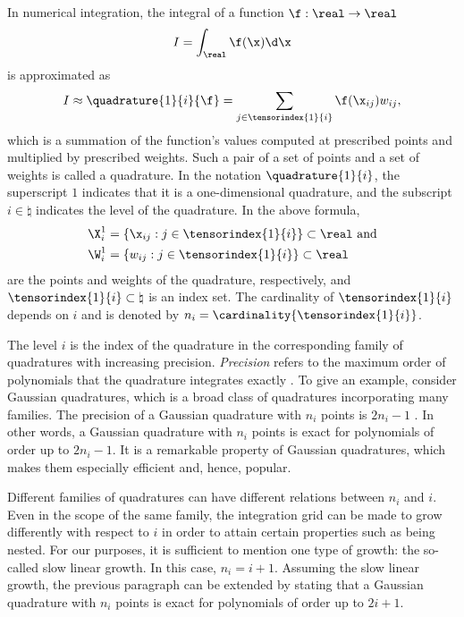 In numerical integration, the integral of a function $\f: \real \to \real$
\[
  I = \int_\real \f(\x) \d \x
\]
is approximated as
\[
  I \approx \quadrature{1}{i}{\f}
  = \sum_{j \in \tensorindex{1}{i}} \f(\x_{ij}) w_{ij},
\]
which is a summation of the function's values computed at prescribed points and
multiplied by prescribed weights. Such a pair of a set of points and a set of
weights is called a quadrature. In the notation $\quadrature{1}{i}$, the
superscript $1$ indicates that it is a one-dimensional quadrature, and the
subscript $i \in \natural$ indicates the level of the quadrature. In the above
formula,
\begin{align*}
  & \X^1_i = \{ \x_{ij}: j \in \tensorindex{1}{i} \} \subset \real \text{ and} \\
  & \W^1_i = \{ w_{ij}: j \in \tensorindex{1}{i} \} \subset \real
\end{align*}
are the points and weights of the quadrature, respectively, and
$\tensorindex{1}{i} \subset \natural$ is an index set. The cardinality of
$\tensorindex{1}{i}$ depends on $i$ and is denoted by $n_i =
\cardinality{\tensorindex{1}{i}}$.

The level $i$ is the index of the quadrature in the corresponding family of
quadratures with increasing precision. \emph{Precision} refers to the maximum
order of polynomials that the quadrature integrates exactly \cite{heiss2008}. To
give an example, consider Gaussian quadratures, which is a broad class of
quadratures incorporating many families. The precision of a Gaussian quadrature
with $n_i$ points is $2 n_i - 1$ \cite{heiss2008}. In other words, a Gaussian
quadrature with $n_i$ points is exact for polynomials of order up to $2 n_i -
1$. It is a remarkable property of Gaussian quadratures, which makes them
especially efficient and, hence, popular.

Different families of quadratures can have different relations between $n_i$ and
$i$. Even in the scope of the same family, the integration grid can be made to
grow differently with respect to $i$ in order to attain certain properties such
as being nested. For our purposes, it is sufficient to mention one type of
growth: the so-called slow linear growth. In this case, $n_i = i + 1$. Assuming
the slow linear growth, the previous paragraph can be extended by stating that a
Gaussian quadrature with $n_i$ points is exact for polynomials of order up to $2
i + 1$.

